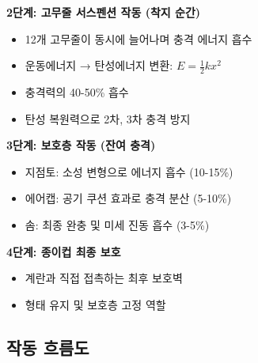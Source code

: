 \documentclass[a4paper,12pt]{article}
\begin{document}
\begin{CJK}{UTF8}{mj}
\textbf{2단계: 고무줄 서스펜션 작동 (착지 순간)}
\begin{itemize}
    \item 12개 고무줄이 동시에 늘어나며 충격 에너지 흡수
    \item 운동에너지 → 탄성에너지 변환: $E = \frac{1}{2}kx^2$
    \item 충격력의 40-50\% 흡수
    \item 탄성 복원력으로 2차, 3차 충격 방지
\end{itemize}

\textbf{3단계: 보호층 작동 (잔여 충격)}
\begin{itemize}
    \item 지점토: 소성 변형으로 에너지 흡수 (10-15\%)
    \item 에어캡: 공기 쿠션 효과로 충격 분산 (5-10\%)
    \item 솜: 최종 완충 및 미세 진동 흡수 (3-5\%)
\end{itemize}

\textbf{4단계: 종이컵 최종 보호}
\begin{itemize}
    \item 계란과 직접 접촉하는 최후 보호벽
    \item 형태 유지 및 보호층 고정 역할
\end{itemize}

\subsection{작동 흐름도}

\begin{center}
\end{center}


\end{CJK}
\end{document}
